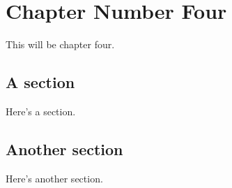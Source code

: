 \chapter{Chapter Number Four}

This will be chapter four.

\section{A section}

Here's a section.

\section{Another section}

Here's another section.


